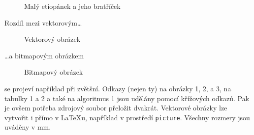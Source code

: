 \documentclass[11pt,a4paper,onecolumn]{article}
\begin{document}
\begin{figure}[h]
\begin{center}
\caption{Malý etiopánek a jeho bratříček}
\end{center}
\end{figure}

Rozdíl mezi vektorovým\dots

\begin{figure}[h]
\begin{center}
\end{center}
\caption{Vektorový obrázek}
\end{figure}

\dots a bitmapovým obrázkem

\begin{figure}[h]
\begin{center}
\end{center}
\caption{Bitmapový obrázek}
\end{figure}

se projeví například při zvětšní.
\indent Odkazy (nejen ty) na obrázky 1, 2, a 3, na tabulky 1 a 2 a také na algoritmus 1 jsou udělány pomocí křížových odkazů. Pak je ovšem potřeba zdrojový soubor přeložit dvakrát.
\indent Vektorové obrázky lze vytvořit i přímo v \LaTeX u, například v prostředí \texttt{picture}. Všechny rozmery jsou uváděny v mm.
\end{document}
